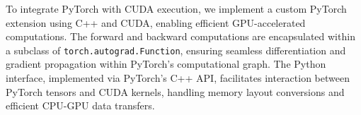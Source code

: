 To integrate PyTorch with CUDA execution, we implement a custom PyTorch extension using C++ and CUDA, enabling efficient GPU-accelerated computations.  
The forward and backward computations are encapsulated within a subclass of \texttt{torch.autograd.Function}, ensuring seamless differentiation and gradient propagation within PyTorch’s computational graph. 
The Python interface, implemented via PyTorch’s C++ API, facilitates interaction between PyTorch tensors and CUDA kernels, handling memory layout conversions and efficient CPU-GPU data transfers.









